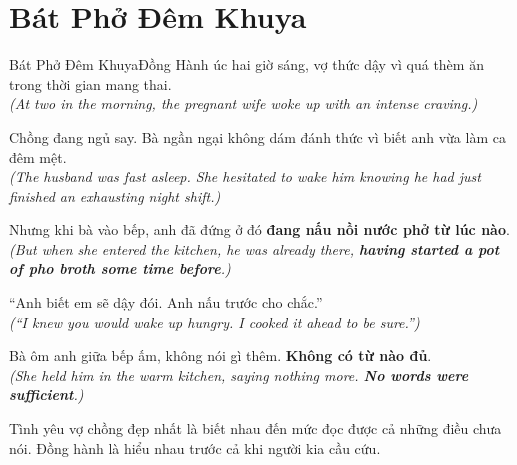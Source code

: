 \section{Bát Phở Đêm Khuya}
\begin{truyen}{Bát Phở Đêm Khuya}{Đồng Hành}
úc hai giờ sáng, vợ thức dậy vì quá thèm ăn trong thời gian mang thai.\\
\textit{(At two in the morning, the pregnant wife woke up with an intense craving.)}

Chồng đang ngủ say. Bà ngần ngại không dám đánh thức vì biết anh vừa làm ca đêm mệt.\\
\textit{(The husband was fast asleep. She hesitated to wake him knowing he had just finished an exhausting night shift.)}

Nhưng khi bà vào bếp, anh đã đứng ở đó \textbf{đang nấu nồi nước phở từ lúc nào}.\\
\textit{(But when she entered the kitchen, he was already there, \textbf{having started a pot of pho broth some time before}.)}

``Anh biết em sẽ dậy đói. Anh nấu trước cho chắc.''\\
\textit{(``I knew you would wake up hungry. I cooked it ahead to be sure.'')}

Bà ôm anh giữa bếp ấm, không nói gì thêm. \textbf{Không có từ nào đủ}.\\
\textit{(She held him in the warm kitchen, saying nothing more. \textbf{No words were sufficient}.)}
\end{truyen}
\begin{baihoc}
  Tình yêu vợ chồng đẹp nhất là biết nhau đến mức đọc được cả những điều chưa nói. Đồng hành là hiểu nhau trước cả khi người kia cầu cứu.
\end{baihoc}

